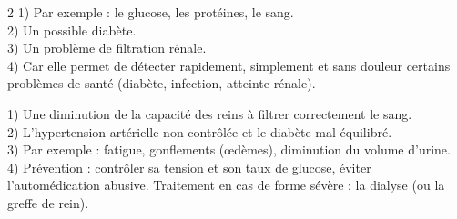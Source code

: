 \begin{multicols}{2}
1) Par exemple : le glucose, les protéines, le sang.\\
2) Un possible diabète.\\
3) Un problème de filtration rénale.\\
4) Car elle permet de détecter rapidement, simplement et sans douleur certains problèmes
de santé (diabète, infection, atteinte rénale).

1) Une diminution de la capacité des reins à filtrer correctement le sang.\\
2) L'hypertension artérielle non contrôlée et le diabète mal équilibré.\\
3) Par exemple : fatigue, gonflements (œdèmes), diminution du volume d'urine.\\
4) Prévention : contrôler sa tension et son taux de glucose, éviter l'automédication
abusive. Traitement en cas de forme sévère : la dialyse (ou la greffe de rein).

\end{multicols}
\exercicesBanner

